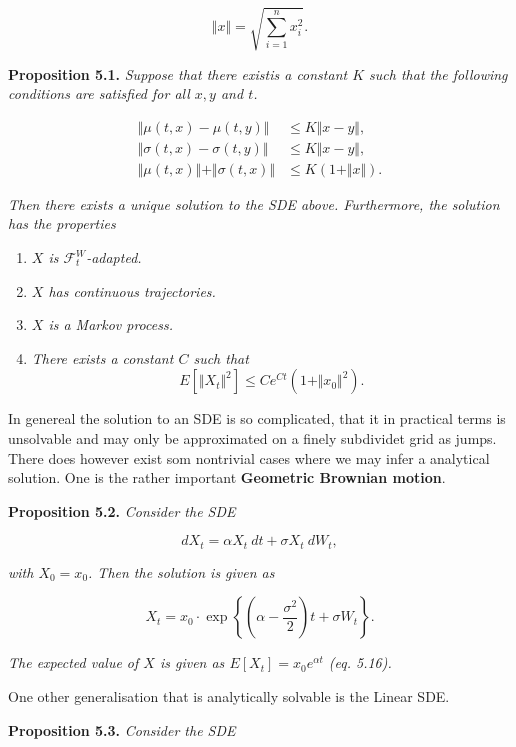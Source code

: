 \documentclass[
]{article}
\providecommand{\tightlist}{%
  \setlength{\itemsep}{0pt}\setlength{\parskip}{0pt}}
\begin{document}
\[
\Vert x\Vert=\sqrt{\sum_{i=1}^nx_i^2}.
\]

\textbf{Proposition 5.1.} \emph{Suppose that there existis a constant
\(K\) such that the following conditions are satisfied for all \(x,y\)
and \(t\).}

\begin{align*}
\Vert \mu(t,x) - \mu(t,y) \Vert &\le K\Vert x-y\Vert,\tag{5.6}\\
\Vert \sigma(t,x) - \sigma(t,y) \Vert &\le K\Vert x-y\Vert,\tag{5.7}\\
\Vert \mu(t,x) \Vert +\Vert \sigma(t,x) \Vert&\le K(1+\Vert x\Vert).\tag{5.8}
\end{align*}

\emph{Then there exists a unique solution to the SDE above. Furthermore,
the solution has the properties}

\begin{enumerate}
\def\labelenumi{\arabic{enumi}.}
\tightlist
\item
  \emph{\(X\) is \(\mathcal{F}_t^W\)-adapted.}
\item
  \emph{\(X\) has continuous trajectories.}
\item
  \emph{\(X\) is a Markov process.}
\item
  \emph{There exists a constant \(C\) such that} \[
    E[\Vert X_t\Vert^2]\le Ce^{Ct}(1+\Vert x_0\Vert^2).\tag{5.9}
    \]
\end{enumerate}

In genereal the solution to an SDE is so complicated, that it in
practical terms is unsolvable and may only be approximated on a finely
subdividet grid as jumps. There does however exist som nontrivial cases
where we may infer a analytical solution. One is the rather important
\textbf{Geometric Brownian motion}.

\textbf{Proposition 5.2.} \emph{Consider the SDE}

\[
dX_t=\alpha X_t\ dt+\sigma X_t\ dW_t,\tag{5.13}
\]

\emph{with \(X_0=x_0\). Then the solution is given as}

\[
X_t=x_0\cdot \exp\left\{\left(\alpha- \frac{\sigma^2}{2}\right)t+\sigma W_t\right\}.\tag{5.15}
\]

\emph{The expected value of \(X\) is given as \(E[X_t]=x_0e^{\alpha t}\)
(eq. 5.16).}

One other generalisation that is analytically solvable is the Linear
SDE.

\textbf{Proposition 5.3.} \emph{Consider the SDE}
\end{document}
